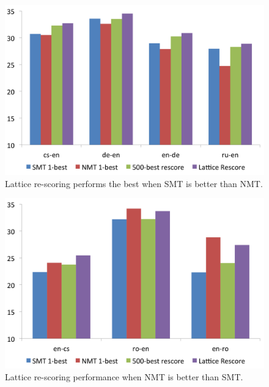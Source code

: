 \documentclass[landscape]{jhuslides3C}
\begin{document}
\begin{figure}
\begin{center}
\includegraphics[scale=0.7]{images/smtBetter.png}
\caption{Lattice re-scoring performs the best when SMT is better than NMT.}
\end{center}
\end{figure}

\begin{figure}
\begin{center}
\includegraphics[scale=0.7]{images/nmtBetter.png}
\caption{Lattice re-scoring performance when NMT is better than SMT.}
\end{center}
\end{figure}
\end{document}
